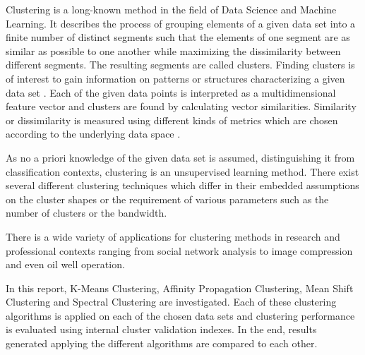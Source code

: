 Clustering is a long-known method in the field of Data Science and Machine Learning. It describes the process of grouping elements of a given data set into a finite number of distinct segments such that the elements of one segment are as similar as possible to one another while maximizing the dissimilarity between different segments. The resulting segments are called clusters. Finding clusters is of interest to gain information on patterns or structures characterizing a given data set \cite{madhulatha2012overview}.
Each of the given data points is interpreted as a multidimensional feature vector and clusters are found by calculating vector similarities. Similarity or dissimilarity is measured using different kinds of metrics which are chosen according to the underlying data space \cite{rokach2005Clustering}.

As no a priori knowledge of the given data set is assumed, distinguishing it from classification contexts, clustering is an unsupervised learning method. There exist several different clustering techniques which differ in their embedded assumptions on the cluster shapes or the requirement of various parameters such as the number of clusters or the bandwidth.

There is a wide variety of applications for clustering methods in research and professional contexts ranging from social network analysis to image compression and even oil well operation.

In this report, K-Means Clustering, Affinity Propagation Clustering, Mean Shift Clustering and Spectral Clustering are investigated.
Each of these clustering algorithms is applied on each of the chosen data sets and clustering performance is evaluated using internal cluster validation indexes. In the end, results generated applying the different algorithms are compared to each other. 

